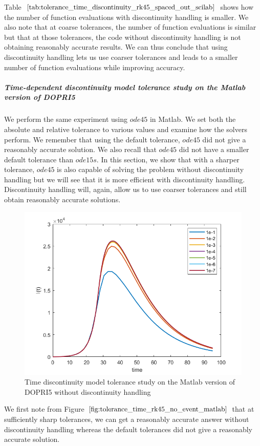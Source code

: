 Table $\ref{tab:tolerance_time_discontinuity_rk45_spaced_out_scilab}$ shows how the number of function evaluations with discontinuity handling is smaller. We also note that at coarse tolerances, the number of function evaluations is similar but that at those tolerances, the code without discontinuity handling is not obtaining reasonably accurate results. We can thus conclude that using discontinuity handling lets us use coarser tolerances and leads to a smaller number of function evaluations while improving accuracy.


\subparagraph{Time-dependent discontinuity model tolerance study on the Matlab version of DOPRI5}
We perform the same experiment using $ode45$ in Matlab. We set both the absolute and relative tolerance to various values and examine how the solvers perform. We remember that using the default tolerance, $ode45$ did not give a reasonably accurate solution. We also recall that $ode45$ did not have a smaller default tolerance than $ode15s$. In this section, we show that with a sharper tolerance, $ode45$ is also capable of solving the problem without discontinuity handling but we will see that it is more efficient with discontinuity handling. Discontinuity handling will, again, allow us to use coarser tolerances and still obtain reasonably accurate solutions.

\begin{figure}[H]
\centering
\includegraphics[width=0.7\linewidth]{./figures/tolerance_time_rk45_no_event_matlab}
\caption{Time discontinuity model tolerance study on the Matlab version of DOPRI5 without discontinuity handling}
\label{fig:tolerance_time_rk45_no_event_matlab}
\end{figure}

We first note from Figure $\ref{fig:tolerance_time_rk45_no_event_matlab}$ that at sufficiently sharp tolerances, we can get a reasonably accurate answer without discontinuity handling whereas the default tolerances did not give a reasonably accurate solution.

